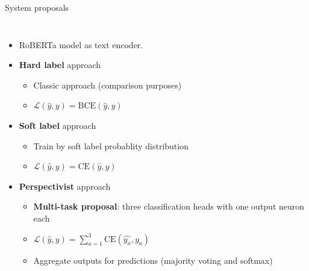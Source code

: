 \begin{frame}{System proposals}
     {
    \begin{columns}
    \begin{itemize}
        \item RoBERTa model as text encoder.
        \item \textbf{Hard label} approach
        \begin{itemize}
            \item Classic approach (comparison purposes)
            \item $\mathcal{L}(\hat{y}, y) = \text{BCE}(\hat{y}, y)$
        \end{itemize}
        \item \textbf{Soft label} approach
        \begin{itemize}
            \item Train by soft label probablity distribution
            \item $\mathcal{L}(\hat{y}, y) = \text{CE}(\hat{y}, y)$
        \end{itemize}
        \item \textbf{Perspectivist} approach
        \begin{itemize}
            \item \textbf{Multi-task proposal}: three classification heads with one output neuron each
            \item $\mathcal{L}(\hat{y}, y) = \sum_{a=1}^{3} \text{CE}(\hat{y_a}, y_a)$
            \item Aggregate outputs for predictions (majority voting and softmax)
        \end{itemize}
    \end{itemize}
    
    \centering
    
    \end{columns}
    }


\end{frame}
